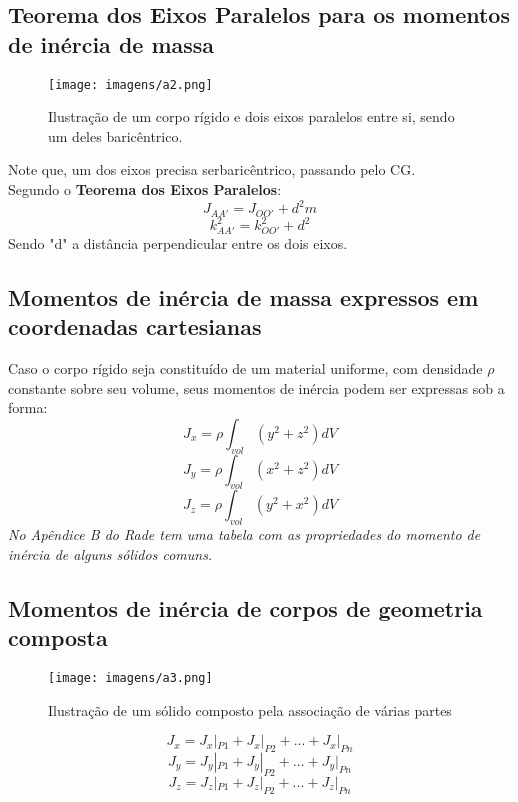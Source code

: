 \documentclass[a4paper, 12pt]{article}
\begin{document}
	\subsection{Teorema dos Eixos Paralelos para os momentos de inércia de massa}
		\begin{figure}[h]
			\center
			\texttt{[image: imagens/a2.png]} 
			\caption{Ilustração de um corpo rígido e dois eixos paralelos entre si, sendo um deles baricêntrico.}
		\end{figure}	
		Note que, um dos eixos precisa serbaricêntrico, passando pelo CG.\\
		
		Segundo o \textbf{Teorema dos Eixos Paralelos}:
			\begin{equation}
				J_{AA'} = J_{OO'} + d^2m
			\end{equation}
			\begin{equation}
				k^2_{AA'} = k^2_{OO'} + d^2
			\end{equation}
		Sendo "d" a distância perpendicular entre os dois eixos. 

	\subsection{Momentos de inércia de massa expressos em coordenadas cartesianas}
		Caso o corpo rígido seja constituído de um material uniforme, com densidade $\rho$ constante sobre seu volume, seus momentos de inércia podem ser expressas sob a forma:
		\begin{equation}
			J_x = \rho \int_{vol}(y^2 + z^2)dV
		\end{equation}
		\begin{equation}
			J_y = \rho \int_{vol}(x^2 + z^2)dV
		\end{equation}
		\begin{equation}
			J_z = \rho \int_{vol}(y^2 + x^2)dV
		\end{equation}
		\textit{No Apêndice B do Rade tem uma tabela com as propriedades do momento de inércia de alguns sólidos comuns.}
		
	\newpage
	\subsection{Momentos de inércia de corpos de geometria composta}
		\begin{figure}[h]
			\center
			\texttt{[image: imagens/a3.png]} 
			\caption{Ilustração de um sólido composto pela associação de várias partes}
		\end{figure}	
		\begin{equation}
			J_x = J_x|_{P1} + J_x|_{P2} + ... + J_x|_{Pn}
		\end{equation}
		\begin{equation}
			J_y = J_y|_{P1} + J_y|_{P2} + ... + J_y|_{Pn}
		\end{equation}
		\begin{equation}
			J_z = J_z|_{P1} + J_z|_{P2} + ... + J_z|_{Pn}
		\end{equation}
	
\end{document}
